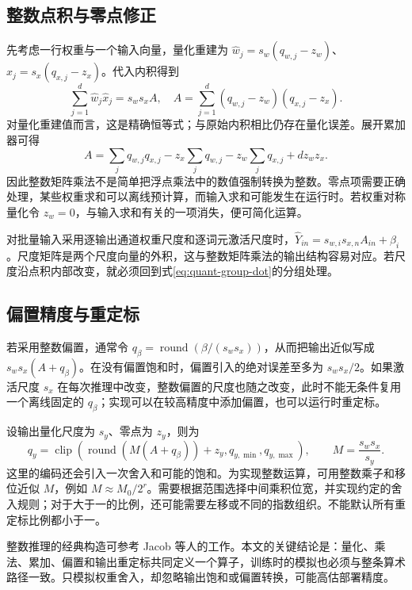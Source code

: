 \documentclass[UTF8,12pt,a4paper,fontset=fandol]{ctexart}
\begin{document}
\subsection{整数点积与零点修正}
先考虑一行权重与一个输入向量，量化重建为 $\widehat w_j=s_w(q_{w,j}-z_w)$、$\widehat x_j=s_x(q_{x,j}-z_x)$。代入内积得到
\begin{equation}
 \sum_{j=1}^d\widehat w_j\widehat x_j=s_ws_x A,
 \quad A=\sum_{j=1}^d(q_{w,j}-z_w)(q_{x,j}-z_x).
 \label{eq:quant-int-dot}
\end{equation}
对量化重建值而言，这是精确恒等式；与原始内积相比仍存在量化误差。展开累加器可得
\begin{equation}
 A=\sum_jq_{w,j}q_{x,j}-z_x\sum_jq_{w,j}
 -z_w\sum_jq_{x,j}+d z_wz_x.
 \label{eq:quant-zero-correction}
\end{equation}
因此整数矩阵乘法不是简单把浮点乘法中的数值强制转换为整数。零点项需要正确处理，某些权重求和可以离线预计算，而输入求和可能发生在运行时。若权重对称量化令 $z_w=0$，与输入求和有关的一项消失，便可简化运算。

对批量输入采用逐输出通道权重尺度和逐词元激活尺度时，$\widehat Y_{in}=s_{w,i}s_{x,n}A_{in}+\beta_i$。尺度矩阵是两个尺度向量的外积，这与整数矩阵乘法的输出结构容易对应。若尺度沿点积内部改变，就必须回到式\eqref{eq:quant-group-dot}的分组处理。

\subsection{偏置精度与重定标}
若采用整数偏置，通常令 $q_\beta=\operatorname{round}(\beta/(s_ws_x))$，从而把输出近似写成 $s_ws_x(A+q_\beta)$。在没有偏置饱和时，偏置引入的绝对误差至多为 $s_ws_x/2$。如果激活尺度 $s_x$ 在每次推理中改变，整数偏置的尺度也随之改变，此时不能无条件复用一个离线固定的 $q_\beta$；实现可以在较高精度中添加偏置，也可以运行时重定标。

设输出量化尺度为 $s_y$、零点为 $z_y$，则为
\begin{equation}
 q_y=\operatorname{clip}\!\left(
 \operatorname{round}\!\left(M(A+q_\beta)\right)+z_y,
 q_{y,\min},q_{y,\max}\right),\qquad M=\frac{s_ws_x}{s_y}.
 \label{eq:quant-requant}
\end{equation}
这里的编码还会引入一次舍入和可能的饱和。为实现整数运算，可用整数乘子和移位近似 $M$，例如 $M\approx M_0/2^r$。需要根据范围选择中间乘积位宽，并实现约定的舍入规则；对于大于一的比例，还可能需要左移或不同的指数组织。不能默认所有重定标比例都小于一。

整数推理的经典构造可参考 Jacob 等人的工作\cite{jacob2018}。本文的关键结论是：量化、乘法、累加、偏置和输出重定标共同定义一个算子，训练时的模拟也必须与整条算术路径一致。只模拟权重舍入，却忽略输出饱和或偏置转换，可能高估部署精度。
\end{document}
